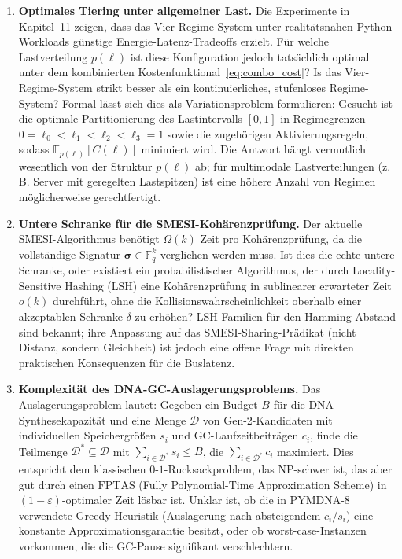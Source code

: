 ﻿\documentclass[a4paper,12pt]{article}
\theoremstyle{definition}
\begin{document}
\begin{enumerate}
  \item \textbf{Optimales Tiering unter allgemeiner Last.} Die Experimente in Kapitel~11 zeigen, dass das Vier-Regime-System unter realitätsnahen Python-Workloads günstige Energie-Latenz-Tradeoffs erzielt. Für welche Lastverteilung $p(\ell)$ ist diese Konfiguration jedoch tatsächlich optimal unter dem kombinierten Kostenfunktional~\eqref{eq:combo_cost}? Is das Vier-Regime-System strikt besser als ein kontinuierliches, stufenloses Regime-System? Formal lässt sich dies als Variationsproblem formulieren: Gesucht ist die optimale Partitionierung des Lastintervalls $[0,1]$ in Regimegrenzen $0 = \ell_0 < \ell_1 < \ell_2 < \ell_3 = 1$ sowie die zugehörigen Aktivierungsregeln, sodass $\mathbb{E}_{p(\ell)}[C(\ell)]$ minimiert wird. Die Antwort hängt vermutlich wesentlich von der Struktur $p(\ell)$ ab; für multimodale Lastverteilungen (z.\,B. Server mit geregelten Lastspitzen) ist eine höhere Anzahl von Regimen möglicherweise gerechtfertigt.

  \item \textbf{Untere Schranke für die SMESI-Kohärenzprüfung.} Der aktuelle SMESI-Algorithmus benötigt $\Omega(k)$ Zeit pro Kohärenzprüfung, da die vollständige Signatur $\boldsymbol{\sigma} \in \mathbb{F}_q^k$ verglichen werden muss. Ist dies die echte untere Schranke, oder existiert ein probabilistischer Algorithmus, der durch Locality-Sensitive Hashing (LSH) eine Kohärenzprüfung in sublinearer erwarteter Zeit $o(k)$ durchführt, ohne die Kollisionswahrscheinlichkeit oberhalb einer akzeptablen Schranke $\delta$ zu erhöhen? LSH-Familien für den Hamming-Abstand sind bekannt; ihre Anpassung auf das SMESI-Sharing-Prädikat (nicht Distanz, sondern Gleichheit) ist jedoch eine offene Frage mit direkten praktischen Konsequenzen für die Buslatenz.

  \item \textbf{Komplexität des DNA-GC-Auslagerungsproblems.} Das Auslagerungsproblem lautet: Gegeben ein Budget $B$ für die DNA-Synthesekapazität und eine Menge $\mathcal{D}$ von Gen-2-Kandidaten mit individuellen Speichergrößen $s_i$ und GC-Laufzeitbeiträgen $c_i$, finde die Teilmenge $\mathcal{D}^* \subseteq \mathcal{D}$ mit $\sum_{i \in \mathcal{D}^*} s_i \leq B$, die $\sum_{i \in \mathcal{D}^*} c_i$ maximiert. Dies entspricht dem klassischen $0$-$1$-Rucksackproblem, das NP-schwer ist, das aber gut durch einen $\mathrm{FPTAS}$ (Fully Polynomial-Time Approximation Scheme) in $(1-\varepsilon)$-optimaler Zeit lösbar ist. Unklar ist, ob die in PYMDNA-8 verwendete Greedy-Heuristik (Auslagerung nach absteigendem $c_i/s_i$) eine konstante Approximationsgarantie besitzt, oder ob worst-case-Instanzen vorkommen, die die GC-Pause signifikant verschlechtern.


\end{enumerate}
\end{document}

